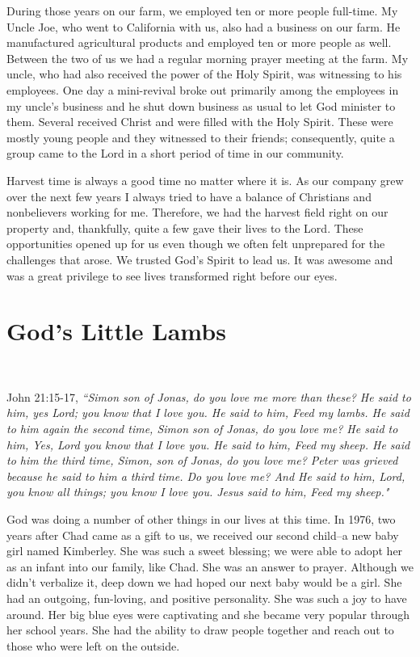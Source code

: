 \documentclass[oneside]{book}
\begin{document}
During those years on our farm, we employed ten or more people full-time. My Uncle Joe, who went to California with us, also had a business on our farm. He manufactured agricultural products and employed ten or more people as well. Between the two of us we had a regular morning prayer meeting at the farm. My uncle, who had also received the power of the Holy Spirit, was witnessing to his employees. One day a mini-revival broke out primarily among the employees in my uncle's business and he shut down business as usual to let God minister to them. Several received Christ and were filled with the Holy Spirit. These were mostly young people and they witnessed to their friends; consequently, quite a group came to the Lord in a short period of time in our community.

Harvest time is always a good time no matter where it is. As our company grew over the next few years I always tried to have a balance of Christians and nonbelievers working for me. Therefore, we had the harvest field right on our property and, thankfully, quite a few gave their lives to the Lord. These opportunities opened up for us even though we often felt unprepared for the challenges that arose. We trusted God's Spirit to lead us. It was awesome and was a great privilege to see lives transformed right before our eyes.


\section{God's Little Lambs}
\

John 21:15-17, \textit{``Simon son of Jonas, do you love me more than these? He said to him, yes Lord; you know that I love you. He said to him, Feed my lambs. He said to him again the second time, Simon son of Jonas, do you love me? He said to him, Yes, Lord you know that I love you. He said to him, Feed my sheep. He said to him the third time, Simon, son of Jonas, do you love me? Peter was grieved because he said to him a third time. Do you love me? And He said to him, Lord, you know all things; you know I love you. Jesus said to him, Feed my sheep."}

God was doing a number of other things in our lives at this time. In 1976, two years after Chad came as a gift to us, we received our second child--a new baby girl named Kimberley. She was such a sweet blessing; we were able to adopt her as an infant into our family, like Chad. She was an answer to prayer. Although we didn't verbalize it, deep down we had hoped our next baby would be a girl. She had an outgoing, fun-loving, and positive personality. She was such a joy to have around. Her big blue eyes were captivating and she became very popular through her school years. She had the ability to draw people together and reach out to those who were left on the outside.
\end{document}
